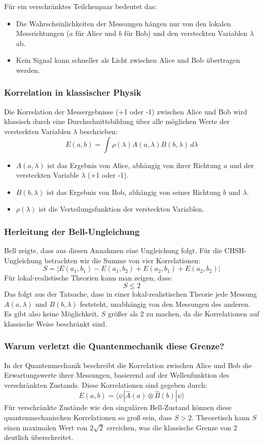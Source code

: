 \documentclass[12pt,a4paper]{article}
\begin{document}
	Für ein verschränktes Teilchenpaar bedeutet das:
	\begin{itemize}
		\item Die Wahrscheinlichkeiten der Messungen hängen nur von den lokalen Messrichtungen (\(a\) für Alice und \(b\) für Bob) und den versteckten Variablen \(\lambda\) ab.
		\item Kein Signal kann schneller als Licht zwischen Alice und Bob übertragen werden.
	\end{itemize}
	
	\subsubsection{Korrelation in klassischer Physik}
	Die Korrelation der Messergebnisse (+1 oder -1) zwischen Alice und Bob wird klassisch durch eine Durchschnittsbildung über alle möglichen Werte der versteckten Variablen \(\lambda\) beschrieben:
	\[
	E(a,b) = \int \rho(\lambda) A(a, \lambda) B(b, \lambda) \, d\lambda
	\]
	\begin{itemize}
		\item \(A(a, \lambda)\) ist das Ergebnis von Alice, abhängig von ihrer Richtung \(a\) und der versteckten Variable \(\lambda\) (+1 oder -1).
		\item \(B(b, \lambda)\) ist das Ergebnis von Bob, abhängig von seiner Richtung \(b\) und \(\lambda\).
		\item \(\rho(\lambda)\) ist die Verteilungsfunktion der versteckten Variablen.
	\end{itemize}
	
	\subsubsection{Herleitung der Bell-Ungleichung}
	Bell zeigte, dass aus diesen Annahmen eine Ungleichung folgt. Für die CHSH-Ungleichung betrachten wir die Summe von vier Korrelationen:
	\[
	S = |E(a_1, b_1) - E(a_1, b_2) + E(a_2, b_1) + E(a_2, b_2)|
	\]
	Für lokal-realistische Theorien kann man zeigen, dass:
	\[
	S \leq 2
	\]
	Das folgt aus der Tatsache, dass in einer lokal-realistischen Theorie jede Messung \(A(a, \lambda)\) und \(B(b, \lambda)\) feststeht, unabhängig von den Messungen des anderen. Es gibt also keine Möglichkeit, \(S\) größer als 2 zu machen, da die Korrelationen auf klassische Weise beschränkt sind.
	
	\subsubsection{Warum verletzt die Quantenmechanik diese Grenze?}
	In der Quantenmechanik beschreibt die Korrelation zwischen Alice und Bob die Erwartungswerte ihrer Messungen, basierend auf der Wellenfunktion des verschränkten Zustands. Diese Korrelationen sind gegeben durch:
	\[
	E(a,b) = \langle \psi | \hat{A}(a) \otimes \hat{B}(b) | \psi \rangle
	\]
	Für verschränkte Zustände wie den singulären Bell-Zustand können diese quantenmechanischen Korrelationen so groß sein, dass \(S > 2\). Theoretisch kann \(S\) einen maximalen Wert von \(2\sqrt{2}\) erreichen, was die klassische Grenze von 2 deutlich überschreitet.
	
\end{document}
